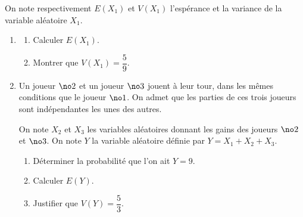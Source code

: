 On note respectivement $E(X_{1})$ et $V(X_{1})$ l'espérance et la variance de la variable aléatoire $X_{1}$.

\medskip

\begin{enumerate}
\item 
	\begin{enumerate}
		\item Calculer $E(X_{1})$.
		\item Montrer que $V(X_{1}) = \dfrac{5}{9}$.
	\end{enumerate}
\item  Un joueur $\no 2$ et un joueur $\no 3$ jouent à leur tour, dans les mêmes conditions que le joueur $\no 1$. On admet que les parties de ces trois joueurs sont indépendantes les unes des autres.

On note $X_{2}$ et $X_{3}$ les variables aléatoires donnant les gains des joueurs $\no 2$ et $\no 3$. On note $Y$ la variable aléatoire définie par $Y = X_{1} + X_{2} + X_{3}$.
	\begin{enumerate}
		\item Déterminer la probabilité que l'on ait $Y = 9$.
		\item Calculer $E(Y)$.
		\item Justifier que $V(Y) = \dfrac{5}{3}$.
	\end{enumerate}
\end{enumerate}
